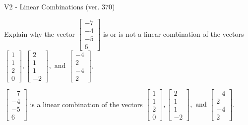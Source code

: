 \begin{exercise}
  \begin{exerciseTitle}V2 - Linear Combinations (ver. 370)\end{exerciseTitle}
  \begin{exerciseStatement}
    Explain why the vector \(\left[\begin{array}{c}
-7 \\
-4 \\
-5 \\
6
\end{array}\right]\)  is or is not a linear 
	combination of the vectors \(\left[\begin{array}{c}
1 \\
1 \\
2 \\
0
\end{array}\right] , \left[\begin{array}{c}
2 \\
1 \\
1 \\
-2
\end{array}\right] , \text{ and } \left[\begin{array}{c}
-4 \\
2 \\
-4 \\
2
\end{array}\right]\).
	


  \end{exerciseStatement}
  \begin{exerciseAnswer}
   \(\left[\begin{array}{c}
-7 \\
-4 \\
-5 \\
6
\end{array}\right]\) 
  	 is  
	a linear combination of the vectors \(\left[\begin{array}{c}
1 \\
1 \\
2 \\
0
\end{array}\right] , \left[\begin{array}{c}
2 \\
1 \\
1 \\
-2
\end{array}\right] , \text{ and } \left[\begin{array}{c}
-4 \\
2 \\
-4 \\
2
\end{array}\right]\).

	
  


  \end{exerciseAnswer}
\end{exercise}